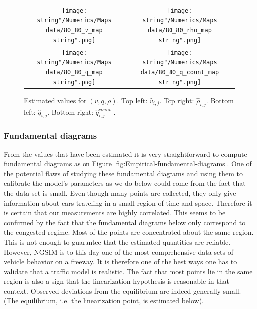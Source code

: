 \documentclass[preprint]{elsarticle}
\begin{document}
\begin{figure}[H]
\centering
\begin{tabular}{cc}
\texttt{[image: \\string"/Numerics/Maps data/80\_80\_v\_map\\string".png]} & \texttt{[image: \\string"/Numerics/Maps data/80\_80\_rho\_map\\string".png]}\tabularnewline
\texttt{[image: \\string"/Numerics/Maps data/80\_80\_q\_map\\string".png]} & \texttt{[image: \\string"/Numerics/Maps data/80\_80\_q\_count\_map\\string".png]}\tabularnewline
\end{tabular}
\protect\caption{Estimated values for $\left(v,q,\rho\right)$. Top left: $\widehat{v}_{i,j}$.
Top right: $\widehat{\rho}_{i,j}$. Bottom left: $\widehat{q}_{i,j}$.
Bottom right: $\widehat{q}_{i,j}^{count}$ .\label{fig:Estimated-values}}
\end{figure}



\subsubsection{Fundamental diagrams}

From the values that have been estimated it is very straightforward
to compute fundamental diagrams as on Figure \ref{fig:Empirical-fundamental-diagrams}.
One of the potential flaws of studying these fundamental diagrams
and using them to calibrate the model's parameters as we do below
could come from the fact that the data set is small. Even though many
points are collected, they only give information about cars traveling
in a small region of time and space. Therefore it is certain that
our measurements are highly correlated. This seems
to be confirmed by the fact that the fundamental diagrams below only
correspond to the congested regime. Most of the points are concentrated
about the same region. This is not enough to guarantee that the estimated
quantities are reliable. However, NGSIM is to this day one of the
most comprehensive data sets of vehicle behavior on a freeway. It
is therefore one of the best ways one has to validate that a traffic
model is realistic. The fact that most points lie in the same region
is also a sign that the linearization hypothesis is reasonable
in that context. Observed deviations from the equilibrium are indeed
generally small. (The equilibrium, i.e. the linearization point, is estimated
below).
\end{document}
